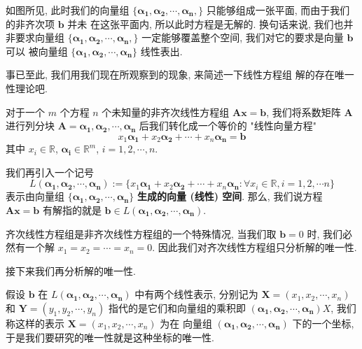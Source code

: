 \documentclass[UTF8]{book}
\begin{document}
    如图所见, 此时我们的向量组 $\{\boldsymbol{\alpha_1},
\boldsymbol{\alpha_2},\cdots, \boldsymbol{\alpha_n}, \}$ 
    只能够组成一张平面, 而由于我们的非齐次项 $\boldsymbol{b}$ 并未
    在这张平面内, 所以此时方程是无解的. 
    换句话来说, 我们也并非要求向量组 $\{\boldsymbol{\alpha_1},
\boldsymbol{\alpha_2},\cdots, \boldsymbol{\alpha_n}, \}$ 
    一定能够覆盖整个空间, 我们对它的要求是向量 $\boldsymbol{b}$ 可以
    被向量组 $\{\boldsymbol{\alpha_1},
\boldsymbol{\alpha_2},\cdots, \boldsymbol{\alpha_n} \}$ 线性表出. 

事已至此, 我们用我们现在所观察到的现象, 来简述一下线性方程组
解的存在唯一性理论吧. 

对于一个 $m$ 个方程 $n$ 个未知量的非齐次线性方程组 
$\boldsymbol{Ax}=\boldsymbol{b}$, 我们将系数矩阵
$\boldsymbol{A}$ 进行列分块 
$\boldsymbol{A}=\boldsymbol{\alpha_1,\alpha_2,\cdots,\alpha_n}$ 
后我们转化成一个等价的 "线性向量方程" 
\begin{equation}
    x_1 \boldsymbol{\alpha_1} + x_2 \boldsymbol{\alpha_2} +
    \cdots + x_n \boldsymbol{\alpha_n} = \boldsymbol{b}
\end{equation}
其中 $x_i \in \mathbb{R}$, $\boldsymbol{\alpha_i}\in \mathbb{R}^m$, 
$i =1,2,\cdots,n$. 

我们再引入一个记号 $$L(\boldsymbol{\alpha_1},
\boldsymbol{\alpha_2},\cdots, \boldsymbol{\alpha_n})
:= \{x_1 \boldsymbol{\alpha_1} + x_2 \boldsymbol{\alpha_2} +
\cdots + x_n \boldsymbol{\alpha_n}: \forall x_i \in \mathbb{R}, 
i=1,2,\cdots n\}$$ 
表示由向量组 $\{\boldsymbol{\alpha_1},
\boldsymbol{\alpha_2},\cdots, \boldsymbol{\alpha_n} \}$ 
\textbf{生成的向量 (线性) 空间}. 
那么, 我们说方程 $\boldsymbol{Ax}=\boldsymbol{b}$ 有解指的就是 
$\boldsymbol{b} \in L(\boldsymbol{\alpha_1},
\boldsymbol{\alpha_2},\cdots, \boldsymbol{\alpha_n}) $. 

齐次线性方程组是非齐次线性方程组的一个特殊情况, 当我们取 
$\boldsymbol{b} = 0$ 时, 我们必然有一个解 $x_1 = x_2 =\cdots= x_n = 0$. 
因此我们对齐次线性方程组只分析解的唯一性. 

接下来我们再分析解的唯一性. 

假设 $\boldsymbol{b} $ 在 $L(\boldsymbol{\alpha_1},
\boldsymbol{\alpha_2},\cdots, \boldsymbol{\alpha_n})$ 中有两个线性表示, 
分别记为 $\boldsymbol{X}=(x_1,x_2,\cdots,x_n)$ 和 
$\boldsymbol{Y} = (y_1,y_2,\cdots,y_n)$ 
指代的是它们和向量组的乘积即 $(\boldsymbol{\alpha_1},
\boldsymbol{\alpha_2},\cdots, \boldsymbol{\alpha_n})X $, 
我们称这样的表示 $\boldsymbol{X}=(x_1,x_2,\cdots,x_n)$ 为在
向量组 $(\boldsymbol{\alpha_1},
\boldsymbol{\alpha_2},\cdots, \boldsymbol{\alpha_n})$ 
下的一个坐标, 于是我们要研究的唯一性就是这种坐标的唯一性. 
\end{document}
